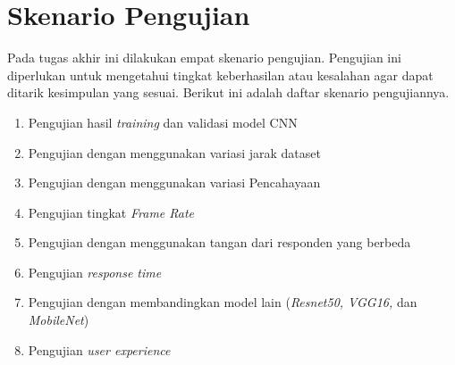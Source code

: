 

\section{Skenario Pengujian}
\label{sec:skenariopengujian}

Pada tugas akhir ini dilakukan empat skenario pengujian. Pengujian ini diperlukan untuk mengetahui tingkat keberhasilan atau kesalahan agar dapat ditarik kesimpulan yang sesuai. Berikut ini adalah daftar skenario pengujiannya.

\begin{enumerate}[nolistsep]

  \item Pengujian hasil \emph{training} dan validasi model CNN
  \item Pengujian dengan menggunakan variasi jarak dataset
  \item Pengujian dengan menggunakan variasi Pencahayaan
  \item Pengujian tingkat \emph{Frame Rate}
  \item Pengujian dengan menggunakan tangan dari responden yang berbeda
  \item Pengujian \emph{response time}
  \item Pengujian dengan membandingkan model lain (\emph{Resnet50, VGG16,} dan \emph{MobileNet}) 
  \item Pengujian \emph{user experience}

\end{enumerate}

